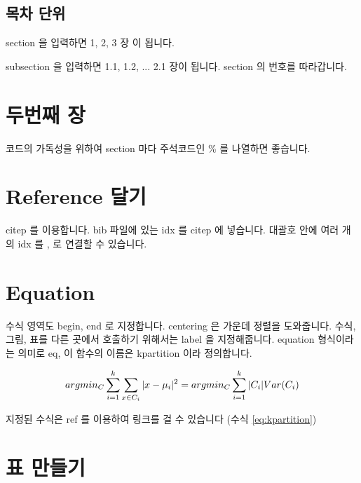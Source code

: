 \documentclass[11pt]{article}
\begin{document}
\subsection{목차 단위}

section 을 입력하면 1, 2, 3 장 이 됩니다.

subsection 을 입력하면 1.1, 1.2, ... 2.1 장이 됩니다. section 의 번호를 따라갑니다.

\section{두번째 장}

코드의 가독성을 위하여 section 마다 주석코드인 \% 를 나열하면 좋습니다.

\section{Reference 달기}

citep 를 이용합니다. bib 파일에 있는 idx 를 citep 에 넣습니다. \citep{jain2010data} 대괄호 안에 여러 개의 idx 를 , 로 연결할 수 있습니다.

\section{Equation}

수식 영역도 begin, end 로 지정합니다.
centering 은 가운데 정렬을 도와줍니다.
수식, 그림, 표를 다른 곳에서 호출하기 위해서는 label 을 지정해줍니다.
equation 형식이라는 의미로 eq, 이 함수의 이름은 kpartition 이라 정의합니다.

\begin{equation}
\label{eq:kpartition}
\centering
arg min_C\sum_{i=1}^{k} \sum_{x \in C_i} \vert x - \mu_i \vert^2 = arg min_C \sum_{i=1}^{k} \vert C_i \vert Var(C_i)
\end{equation}

지정된 수식은 ref 를 이용하여 링크를 걸 수 있습니다 (수식 \ref{eq:kpartition})

\section{표 만들기}
\end{document}

